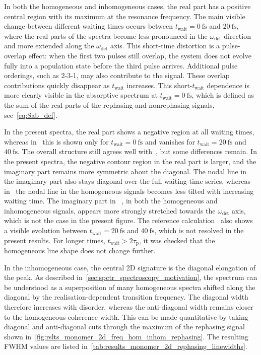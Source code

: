 In both the homogeneous and inhomogeneous cases, the real part has a positive
central region with its maximum at the resonance frequency. The main visible
change between different waiting times occurs
between $t_{\mathrm{wait}}=\SI{0}{\femto\second}$ and
$\SI{20}{\femto\second}$, where the real parts of the spectra become less pronounced in the
$\omega_{\mathrm{det}}$ direction and more extended along the $\omega_{\mathrm{det}}$ axis.
This short-time distortion is a pulse-overlap
effect: when the first two pulses still overlap, the system does not evolve
fully into a population state before the third pulse arrives. Additional pulse orderings, such as 2-3-1, may also contribute to the signal. These overlap contributions quickly disappear as $t_{\mathrm{wait}}$ increases. This
short-$t_{\mathrm{wait}}$ dependence is more clearly visible in the absorptive
spectrum at $t_{\mathrm{wait}}=\SI{0}{\femto\second}$, which is defined as the
sum of the real parts of the rephasing and nonrephasing signals,
see~\autoref{eq:Sab_def}.

In the present spectra, the real part shows a
negative region at all waiting times, whereas in~\cite{mancaletal2006twodimensionalopticalthreepulse} this is shown only for
$t_{\mathrm{wait}}=\SI{0}{\femto\second}$ and vanishes for
$t_{\mathrm{wait}}=\SI{20}{\femto\second}$ and
$\SI{40}{\femto\second}$. The overall structure still agrees
well with~\cite{mancaletal2006twodimensionalopticalthreepulse}, but some differences remain. In the present spectra, the
negative contour region in the real part is larger, and the imaginary part
remains more symmetric about the diagonal. The nodal line in the imaginary part
also stays diagonal over the full waiting-time series, whereas in~\cite{mancaletal2006twodimensionalopticalthreepulse} the
nodal line in the homogeneous signals becomes less tilted with
increasing waiting time. The imaginary part in
~\cite{mancaletal2006twodimensionalopticalthreepulse}, in both the homogeneous and inhomogeneous signals, appears more strongly stretched towards the
$\omega_{\mathrm{det}}$ axis, which is not the case in the present figure.
The reference calculation~\cite{mancaletal2006twodimensionalopticalthreepulse} also shows a visible evolution between
$t_{\mathrm{wait}}=\SI{20}{\femto\second}$ and
$\SI{40}{\femto\second}$, which is not resolved in the present results. For
longer times, $t_{\mathrm{wait}} > 2\tau_{\mathrm{p}}$, it was checked that the
homogeneous line shape does not change further.

In the inhomogeneous case, the central 2D signature is the diagonal elongation
of the peak. As described in~\autoref{sec:spctr_spectroscopy_motivation}, the
spectrum can be understood as a superposition of many homogeneous spectra
shifted along the diagonal by the realisation-dependent transition frequency.
The diagonal width therefore increases with disorder, whereas the anti-diagonal
width remains closer to the homogeneous coherence width. This can be made
quantitative by taking diagonal and anti-diagonal cuts through the maximum of
the rephasing signal shown in~\autoref{fig:rslts_monomer_2d_freq_hom_inhom_rephasing}.
The resulting FWHM values are listed
in~\autoref{tab:results_monomer_2d_rephasing_linewidths}.

